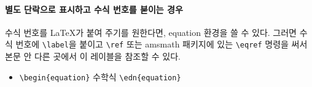 	\paragraph{별도 단락으로 표시하고 수식 번호를 붇이는 경우}
	수식 번호를 \LaTeX 가 붙여 주기를 원한다면, equation 환경을 쓸 수 있다. 
	그러면 수식 번호에 \verb|\label|을 붙이고 \verb|\ref| 또는 
	amsmath  패키지에 있는 \verb|\eqref| 명령을 써서 본문 안 다른 곳에서 이 레이블을 참조할 수 있다.

	\begin{itemize}
	\item 	\verb|\begin{equation}| 수학식 \verb|\edn{equation}|
	\end{itemize}


%
%
%
\clearpage
